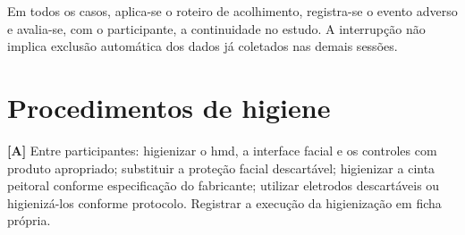 Em todos os casos, aplica-se o roteiro de acolhimento, registra-se o evento adverso e avalia-se, com o participante, a continuidade no estudo. A interrupção não implica exclusão automática dos dados já coletados nas demais sessões.

\section*{Procedimentos de higiene}

\noindent\textbf{[A]} Entre participantes: higienizar o \gls{hmd}, a interface facial e os controles com produto apropriado; substituir a proteção facial descartável; higienizar a cinta peitoral conforme especificação do fabricante; utilizar eletrodos descartáveis ou higienizá-los conforme protocolo. Registrar a execução da higienização em ficha própria.
